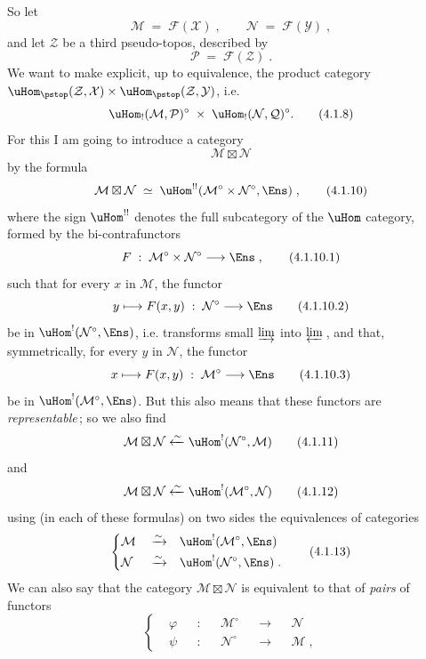 So let
\[
\mathcal{M} \;=\; \mathcal{F}(\mathcal{X})\;, \qquad \mathcal{N} \;=\; \mathcal{F}(\mathcal{Y})\;,
\tag*{(4.1.6)}
\]
and let $\mathcal{Z}$ be a third pseudo-topos, described by
\[
\mathcal{P} \;=\; \mathcal{F}(\mathcal{Z})\;.
\tag*{(4.1.7)}
\]
We want to make explicit, up to equivalence, the product category $\uHom_{\pstop}(\mathcal{Z},\mathcal{X})\times\uHom_{\pstop}(\mathcal{Z},\mathcal{Y})$, i.e.
\[
\uHom_!(\mathcal{M},\mathcal{P})^\circ \;\times\; \uHom_!(\mathcal{N},\mathcal{Q})^\circ.
\tag*{(4.1.8)}
\] %
For this I am going to introduce a category
\[
\mathcal{M}\boxtimes\mathcal{N}
\tag*{(4.1.9)}
\]
by the formula
\[
\mathcal{M}\boxtimes\mathcal{N} \;\simeq\; \uHom^{!!}(\mathcal{M}^\circ\times\mathcal{N}^\circ,\Ens)\;,
\tag*{(4.1.10)}
\]
where the sign $\uHom^{!!}$ denotes the full subcategory of the $\uHom$ category, formed by the bi-contrafunctors %
\[
F \;:\; \mathcal{M}^\circ\times\mathcal{N}^\circ \longrightarrow \Ens\;,
\tag*{(4.1.10.1)}
\]
such that for every $x$ in $\mathcal{M}$, the functor
\[
y \longmapsto F(x,y) \;:\; \mathcal{N}^\circ \longrightarrow \Ens
\tag*{(4.1.10.2)}
\]
be in $\uHom^!(\mathcal{N}^\circ,\Ens)$, i.e. transforms small $\varinjlim$ into $\varprojlim$\,, and that, symmetrically, for every $y$ in $\mathcal{N}$, the functor
\[
x \longmapsto F(x,y) \;:\; \mathcal{M}^\circ \longrightarrow \Ens
\tag*{(4.1.10.3)}
\]
be in $\uHom^!(\mathcal{M}^\circ,\Ens)$. But this also means that these functors are \textit{representable}\,; so we also find
\[
\mathcal{M}\boxtimes\mathcal{N} \xleftarrow{\sim} \uHom^!(\mathcal{N}^\circ,\mathcal{M})
\tag*{(4.1.11)}
\]
and
\[
\mathcal{M}\boxtimes\mathcal{N} \xleftarrow{\sim} \uHom^!(\mathcal{M}^\circ,\mathcal{N})
\tag*{(4.1.12)}
\]
using (in each of these formulas) on two sides the equivalences of categories
\[
\left\{
\begin{aligned}
&\mathcal{M} &&\xrightarrow{\sim} &&\uHom^!(\mathcal{M}^\circ,\Ens)\\
&\mathcal{N} &&\xrightarrow{\sim} &&\uHom^!(\mathcal{N}^\circ,\Ens)\;.
\end{aligned}
\right.
\tag*{(4.1.13)}
\]
We can also say that the category $\mathcal{M}\boxtimes\mathcal{N}$ is equivalent to that of \textit{pairs} of functors
\[
\left\{
\begin{aligned}
&\varphi &&: &&\mathcal{M}^\circ &&\longrightarrow &&\mathcal{N}\\
&\psi &&: &&\mathcal{N}^\circ &&\longrightarrow &&\mathcal{M}\;,
\end{aligned}
\right.
\tag*{(4.1.14)}
\]
